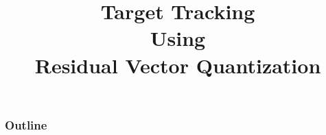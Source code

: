 

\title{Target Tracking \\ Using \\Residual Vector Quantization}
\begin{frame}[plain]
\logoTree
	\titlepage

\end{frame}

\begin{frame}
\frametitle{Outline}
\logoTree
	\setcounter{tocdepth}{1}	
	\tableofcontents
\end{frame}

